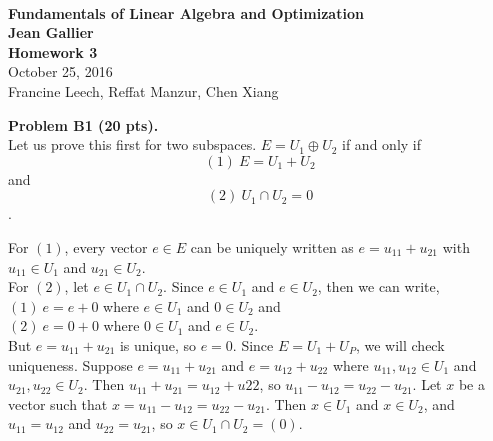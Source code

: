 \documentclass[12pt]{article}
\begin{document}


\begin{center}
\\
\vspace{1cm}
{\Large\bf Fundamentals of Linear Algebra and Optimization\\
Jean Gallier \\
\vspace{0.5cm}
Homework 3}\\[10pt]
October 25, 2016\\
Francine Leech, Reffat Manzur, Chen Xiang \\
\end{center}


\vspace {0.25cm}\noindent
{\bf Problem B1 (20 pts).} \\
Let us prove this first for two subspaces. $E = U_1 \oplus U_2$ if and only if $$ (1)\ E = U_1  + U_2$$ and $$(2)\ U_1 \cap U_2 = {0}$$. 

For $(1)$, every vector $e \in E$ can be uniquely written as $e = u_{11} + u_{21}$ with $u_{11} \in U_1$ and $u_{21} \in U_2$. \\

For $(2)$, let $e \in U_1 \cap U_2$. Since $e \in U_1$ and $e \in U_2$, then we can write, \\

$(1)\ e = e + 0$ where $e \in U_1$ and $0 \in U_2$ and  \\

$(2)\ e = 0 + 0$ where $0 \in U_1$ and $e \in U_2$.  \\ 

But $e = u_{11} + u_{21}$ is unique, so $e=0$. Since $E = U_1 + U_P$, we will check uniqueness. Suppose $e = u_{11} + u_{21}$ and $e = u_{12} + u_{22}$ where $u_{11} , u_{12}  \in U_1$ and $u_{21} , u_{22}  \in U_2$. Then $u_{11} + u_{21} = u_{12} + u{22}$, so $u_{11} - u_{12} = u_{22} - u_{21}$.  Let $x$ be a vector such that $x = u_{11} - u_{12} = u_{22} - u_{21}$. Then $x \in U_1$ and $x \in U_2$, and $u_{11} = u_{12}$ and $u_{22} = u_{21}$, so $x \in U_1 \cap U_2 = (0)$. \\
\end{document}
